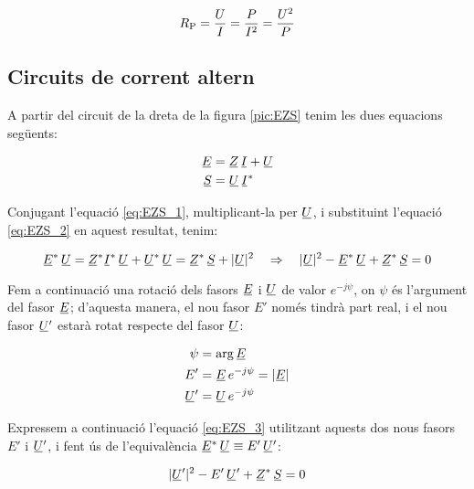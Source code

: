 \begin{equation}
   R_\mathrm{P} = \frac{U}{I} = \frac{P}{I^2} = \frac{U^2}{P}
\end{equation}

\subsection{Circuits de corrent altern}

A partir del circuit de la dreta de la figura \vref{pic:EZS} tenim les dues equacions següents:

\begin{align}
   \cmplx{E} &= \cmplx{Z} \, \cmplx{I} + \cmplx{U} \label{eq:EZS_1} \\
   \cmplx{S} &= \cmplx{U} \, \cmplx{I}^*           \label{eq:EZS_2}
\end{align}

Conjugant l'equació \eqref{eq:EZS_1}, multiplicant-la per $\cmplx{U}$, i substituint l'equació \eqref{eq:EZS_2} en aquest resultat, tenim:

\begin{equation}
   \cmplx{E}^* \, \cmplx{U} = \cmplx{Z}^* \cmplx{I}^* \, \cmplx{U} + \cmplx{U}^* \, \cmplx{U} =
   \cmplx{Z}^* \, \cmplx{S} + |\cmplx{U}|^2 \quad \Rightarrow \quad
   |\cmplx{U}|^2 - \cmplx{E}^* \, \cmplx{U} + \cmplx{Z}^* \, \cmplx{S} = 0
   \label{eq:EZS_3}
\end{equation}

Fem a continuació una rotació dels fasors $\cmplx{E}$ i
$\cmplx{U}$ de valor $e^{-j\psi}$, on $\psi$ és l'argument
del fasor $\cmplx{E}$; d'aquesta manera, el nou fasor $E'$ només tindrà part real, i el nou fasor $\cmplx{U}'$ estarà rotat 
respecte del fasor $\cmplx{U}$:

\begin{align}
   \psi &= \arg\cmplx{E} \label{eq:EZS_9} \\
   E' &= \cmplx{E} \, e^{-j\psi} = |\cmplx{E}|  \label{eq:EZS_4} \\
   \cmplx{U}' &= \cmplx{U} \, e^{-j\psi}   \label{eq:EZS_5} 
\end{align}

Expressem a continuació l'equació \eqref{eq:EZS_3} utilitzant
aquests dos nous fasors $E'$ i $\cmplx{U}'$, i fent ús de l'equivalència $\cmplx{E}^* \, \cmplx{U} \equiv E'\, \cmplx{U}'$:

\begin{equation}
   |\cmplx{U}'|^2 - E' \, \cmplx{U}' + \cmplx{Z}^* \, \cmplx{S} = 0 \label{eq:EZS_6}
\end{equation}


